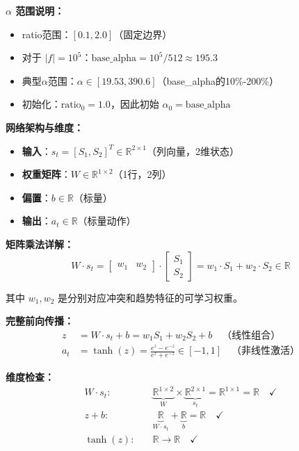 \documentclass[11pt,a3paper]{ctexart}
\begin{document}
\textbf{$\alpha$ 范围说明：}
\begin{itemize}
 \item ratio范围：$[0.1, 2.0]$（固定边界）
    \item 对于 $|f| = 10^5$：$\text{base\_alpha} = 10^5 / 512 \approx 195.3$
    \item 典型$\alpha$范围：$\alpha \in [19.53, 390.6]$（base\_alpha的10\%-200\%）
    \item 初始化：$\text{ratio}_0 = 1.0$，因此初始 $\alpha_0 = \text{base\_alpha}$
\end{itemize}

\textbf{网络架构与维度：}

\begin{itemize}
    \item \textbf{输入}：$s_t = [S_1, S_2]^T \in \mathbb{R}^{2 \times 1}$（列向量，2维状态）
    \item \textbf{权重矩阵}：$W \in \mathbb{R}^{1 \times 2}$（1行，2列）
    \item \textbf{偏置}：$b \in \mathbb{R}$（标量）
    \item \textbf{输出}：$a_t \in \mathbb{R}$（标量动作）
\end{itemize}

\textbf{矩阵乘法详解：}
\begin{equation}
W \cdot s_t = \begin{bmatrix} w_1 & w_2 \end{bmatrix} \cdot \begin{bmatrix} S_1 \\ S_2 \end{bmatrix} = w_1 \cdot S_1 + w_2 \cdot S_2 \in \mathbb{R}
\end{equation}

其中 $w_1, w_2$ 是分别对应冲突和趋势特征的可学习权重。

\textbf{完整前向传播：}
\begin{align}
z &= W \cdot s_t + b = w_1 S_1 + w_2 S_2 + b \quad \text{（线性组合）} \\
a_t &= \tanh(z) = \frac{e^z - e^{-z}}{e^z + e^{-z}} \in [-1, 1] \quad \text{（非线性激活）}
\end{align}

\textbf{维度检查：}
\begin{align}
W \cdot s_t: & \quad \underbrace{\mathbb{R}^{1 \times 2}}_{W} \times \underbrace{\mathbb{R}^{2 \times 1}}_{s_t} = \mathbb{R}^{1 \times 1} = \mathbb{R} \quad \checkmark \\
z + b: & \quad \underbrace{\mathbb{R}}_{W \cdot s_t} + \underbrace{\mathbb{R}}_{b} = \mathbb{R} \quad \checkmark \\
\tanh(z): & \quad \mathbb{R} \rightarrow \mathbb{R} \quad \checkmark
\end{align}
\end{document}
